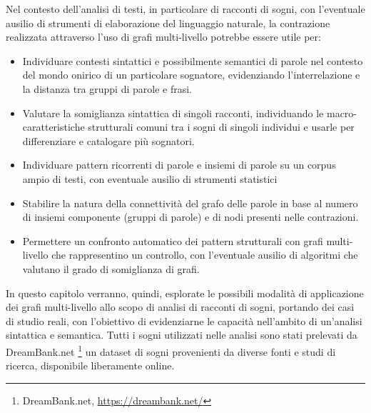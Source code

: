 Nel contesto dell'analisi di testi, in particolare di racconti di sogni, con l'eventuale ausilio di strumenti di
elaborazione del linguaggio naturale, la contrazione realizzata attraverso l'uso di grafi multi-livello potrebbe
essere utile per:
\begin{itemize}
    \item Individuare contesti sintattici e possibilmente semantici di parole nel contesto del mondo onirico
    di un particolare sognatore, evidenziando l'interrelazione e la distanza tra gruppi di parole e frasi.
    \item Valutare la somiglianza sintattica di singoli racconti, individuando le macro-caratteristiche
    strutturali comuni tra i sogni di singoli individui e usarle per differenziare e catalogare più sognatori.
    \item Individuare pattern ricorrenti di parole e insiemi di parole su un corpus ampio di testi, con
    eventuale ausilio di strumenti statistici
    \item Stabilire la natura della connettività del grafo delle parole in base al numero di insiemi componente
    (gruppi di parole) e di nodi presenti nelle contrazioni.
    \item Permettere un confronto automatico dei pattern strutturali con grafi multi-livello che rappresentino
    un controllo, con l'eventuale ausilio di algoritmi che valutano il grado di somiglianza di grafi.
\end{itemize}

In questo capitolo verranno, quindi, esplorate le possibili modalità di applicazione dei grafi multi-livello allo scopo
di analisi di racconti di sogni, portando dei casi di studio reali, con l'obiettivo di evidenziarne le capacità
nell'ambito di un'analisi sintattica e semantica.
Tutti i sogni utilizzati nelle analisi sono stati prelevati da DreamBank.net \footnote{DreamBank.net, \url{https://dreambank.net/}}
un dataset di sogni provenienti da diverse fonti e studi di ricerca, disponibile liberamente online.



